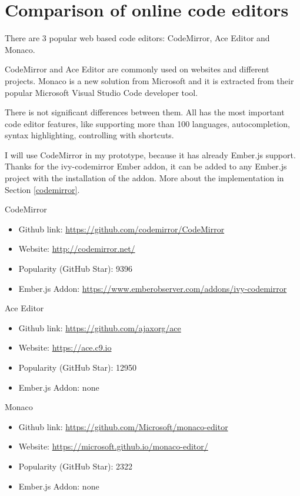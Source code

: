 \documentclass[12pt, a4paper, oneside, openright, medskipamount]{report}
\begin{document}
\section{Comparison of online code editors} \label{comparison}

There are 3 popular web based code editors: CodeMirror, Ace Editor and Monaco.

CodeMirror and Ace Editor are commonly used on websites and different projects. Monaco is a new solution from Microsoft and it is extracted from their popular Microsoft Visual Studio Code developer tool.

There is not significant differences between them. All has the most important code editor features, like supporting more than 100 languages, autocompletion, syntax highlighting, controlling with shortcuts.

I will use CodeMirror in my prototype, because it has already Ember.js support. Thanks for the ivy-codemirror Ember addon, it can be added to any Ember.js project with the installation of the addon. More about the implementation in Section \ref{codemirror}.

\noindent CodeMirror
\begin{itemize}[noitemsep]
\item Github link: \url{https://github.com/codemirror/CodeMirror}
\item Website: \url{http://codemirror.net/}
\item Popularity (GitHub Star): 9396
\item Ember.js Addon: \url{https://www.emberobserver.com/addons/ivy-codemirror}
\end{itemize}

\noindent Ace Editor
\begin{itemize}[noitemsep]
\item Github link: \url{https://github.com/ajaxorg/ace}
\item Website: \url{https://ace.c9.io}
\item Popularity (GitHub Star): 12950
\item Ember.js Addon: none
\end{itemize}

\noindent Monaco
\begin{itemize}[noitemsep]
\item Github link: \url{https://github.com/Microsoft/monaco-editor}
\item Website: \url{https://microsoft.github.io/monaco-editor/}
\item Popularity (GitHub Star): 2322
\item Ember.js Addon: none
\end{itemize}
\end{document}
